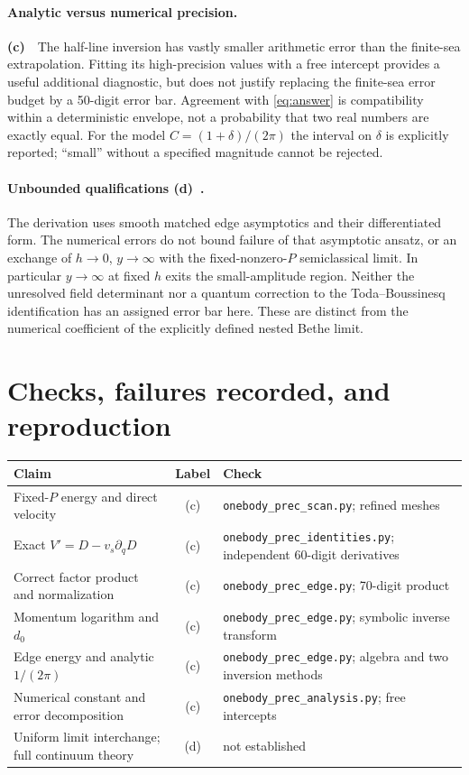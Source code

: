 \documentclass[11pt,a4paper]{article}
\newcommand{\Lc}{\textbf{(c)}\ }
\newcommand{\Ld}{\textbf{(d)}\ }
\newcommand{\scan}{\texttt{onebody\_\allowbreak prec\_\allowbreak scan.py}}
\newcommand{\edge}{\texttt{onebody\_\allowbreak prec\_\allowbreak edge.py}}
\newcommand{\ids}{\texttt{onebody\_\allowbreak prec\_\allowbreak identities.py}}
\newcommand{\ana}{\texttt{onebody\_\allowbreak prec\_\allowbreak analysis.py}}
\begin{document}
\paragraph{Analytic versus numerical precision.}
\Lc\ The half-line inversion has vastly smaller arithmetic error than the
finite-sea extrapolation. Fitting its high-precision values with a free
intercept provides a useful additional diagnostic, but does not justify
replacing the finite-sea error budget by a 50-digit error bar.
Agreement with \eqref{eq:answer} is compatibility within a deterministic
envelope, not a probability that two real numbers are exactly equal.
For the model $C=(1+\delta)/(2\pi)$ the interval on $\delta$ is explicitly
reported; ``small'' without a specified magnitude cannot be rejected.

\paragraph{Unbounded qualifications \Ld.}
The derivation uses smooth matched edge asymptotics and their differentiated
form. The numerical errors do not bound failure of that asymptotic ansatz,
or an exchange of $h\to0$, $y\to\infty$ with the fixed-nonzero-$P$
semiclassical limit. In particular $y\to\infty$ at fixed $h$ exits the
small-amplitude region. Neither the unresolved field determinant nor a
quantum correction to the Toda--Boussinesq identification has an assigned
error bar here. These are distinct from the numerical coefficient of the
explicitly defined nested Bethe limit.

\section{Checks, failures recorded, and reproduction}
\begin{center}\small
\begin{tabular}{>{\raggedright\arraybackslash}p{.45\linewidth}c>{\raggedright\arraybackslash}p{.36\linewidth}}
\toprule Claim & Label & Check\\\midrule
Fixed-$P$ energy and direct velocity & (c) & \scan; refined meshes\\
Exact $V'=D-v_s\partial_qD$ & (c) & \ids; independent 60-digit derivatives\\
Correct factor product and normalization & (c) & \edge; 70-digit product\\
Momentum logarithm and $d_0$ & (c) & \edge; symbolic inverse transform\\
Edge energy and analytic $1/(2\pi)$ & (c) & \edge; algebra and two inversion methods\\
Numerical constant and error decomposition & (c) & \ana; free intercepts\\
Uniform limit interchange; full continuum theory & (d) & not established\\
\bottomrule
\end{tabular}
\end{center}
\end{document}
